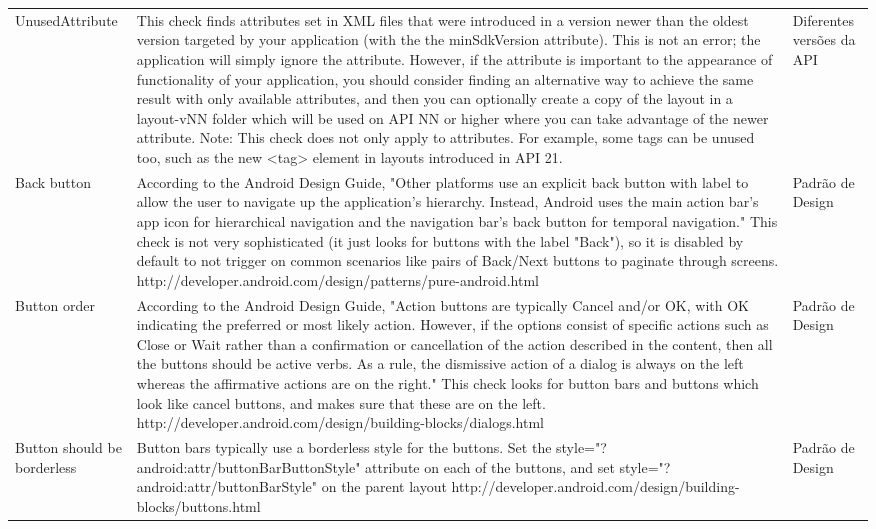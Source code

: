 \begin{landscape}
\begin{longtable}{p{30mm}|p{180mm}|p{25mm}}
\hline                               
UnusedAttribute & 
This check finds attributes set in XML files that were introduced in a version
newer than the oldest version targeted by your application (with the the minSdkVersion
attribute). This is not an error; the application will simply ignore the attribute.
However, if the attribute is important to the appearance of functionality of your
application, you should consider finding an alternative way to achieve the same
result with only available attributes, and then you can optionally create a copy
of the layout in a layout-vNN folder which will be used on API NN or higher where
you can take advantage of the newer attribute. Note: This check does not only apply
to attributes. For example, some tags can be unused too, such as the new <tag> element
in layouts introduced in API 21.
& Diferentes versões da API \\

Back button & According to the Android Design Guide, "Other platforms use an explicit
back button with label to allow the user to navigate up the application's hierarchy.
Instead, Android uses the main action bar's app icon for hierarchical navigation
and the navigation bar's back button for temporal navigation." This check is not
very sophisticated (it just looks for buttons with the label "Back"), so it is
disabled by default to not trigger on common scenarios like pairs of Back/Next
buttons to paginate through screens. http://developer.android.com/design/patterns/pure-android.html
& Padrão de Design \\

Button order & According to the Android Design Guide, "Action buttons are typically
Cancel and/or OK, with OK indicating the preferred or most likely action. However,
if the options consist of specific actions such as Close or Wait rather than a
confirmation or cancellation of the action described in the content, then all the
buttons should be active verbs. As a rule, the dismissive action of a dialog is
always on the left whereas the affirmative actions are on the right." This check
looks for button bars and buttons which look like cancel buttons, and makes sure
that these are on the left. http://developer.android.com/design/building-blocks/dialogs.html
& Padrão de Design \\

Button should be borderless & Button bars typically use a borderless style for
the buttons. Set the style="?android:attr/buttonBarButtonStyle" attribute on each
of the buttons, and set style="?android:attr/buttonBarStyle" on the parent layout
http://developer.android.com/design/building-blocks/buttons.html
& Padrão de Design \\


\end{longtable}
\end{landscape}
